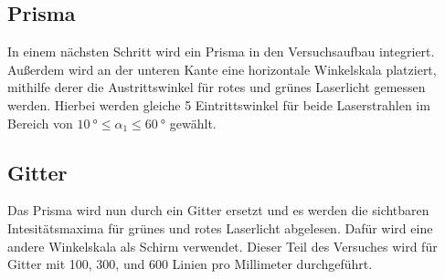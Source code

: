 \subsection{Prisma}
In einem nächsten Schritt wird ein Prisma in den Versuchsaufbau integriert. Außerdem wird an der unteren Kante eine 
horizontale Winkelskala platziert, mithilfe derer die Austrittswinkel für rotes und grünes Laserlicht gemessen werden.
Hierbei werden gleiche 5 Eintrittswinkel für beide Laserstrahlen im Bereich von $\qty{10}{\degree} ≤ \alpha_1 ≤ \qty{60}{\degree}$
gewählt.

\subsection{Gitter}
Das Prisma wird nun durch ein Gitter ersetzt und es werden die sichtbaren Intesitätsmaxima für grünes und rotes Laserlicht
abgelesen. Dafür wird eine andere Winkelskala als Schirm verwendet. Dieser Teil des Versuches wird für Gitter mit 100, 300, und
600 Linien pro Millimeter durchgeführt.